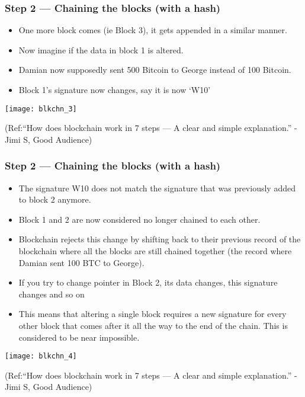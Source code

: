 \begin{frame}[fragile]\frametitle{Step 2 — Chaining the blocks (with a hash)}
\begin{itemize}
\item One more block comes (ie Block 3), it gets appended in a similar manner.
\item Now imagine if the data in block 1 is altered.
\item Damian now supposedly sent 500 Bitcoin to George instead of 100 Bitcoin.
\item Block 1's signature now changes, say it is now ‘W10’
\end{itemize}

\begin{center}
\texttt{[image: blkchn\_3]}

{\tiny (Ref:``How does blockchain work in 7 steps — A clear and simple explanation.'' - Jimi S, Good Audience)}
\end{center}

\end{frame}

\begin{frame}[fragile]\frametitle{Step 2 — Chaining the blocks (with a hash)}
\begin{itemize}
\item The signature W10 does not match the signature that was previously added to block 2 anymore. 
\item Block 1 and 2 are now considered no longer chained to each other. 
\item Blockchain rejects this change by shifting back to their previous record of the blockchain where all the blocks are still chained together (the record where Damian sent 100 BTC to George).
\item If you try to change pointer in Block 2, its data changes, this signature changes and so on
\item This means that altering a single block requires a new signature for every other block that comes after it all the way to the end of the chain. This is considered to be near impossible.
\end{itemize}

\begin{center}
\texttt{[image: blkchn\_4]}

{\tiny (Ref:``How does blockchain work in 7 steps — A clear and simple explanation.'' - Jimi S, Good Audience)}
\end{center}

\end{frame}

